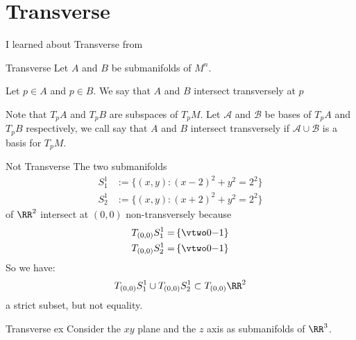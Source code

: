 \section{Transverse}

I learned about Transverse from \cite{lee_2013}

\begin{boxDefinition}{Transverse}
Let \( A \) and \( B \) be submanifolds of \( M^n \).

Let \( p \in A \) and \( p \in B \).
We say that \( A \) and \( B \) intersect transversely at \( p \)

Note that \( T_pA \) and \( T_pB \) are subspaces of \( T_pM \).
Let \( \mathcal A \) and \( \mathcal B \) be bases of \( T_pA \) and \(T_pB \) respectively,
    we call say that \( A \) and \( B \) intersect transversely if \( \mathcal A \cup \mathcal B \) is a basis for \( T_pM \).
\end{boxDefinition}
\begin{boxExample}{Not Transverse}
The two submanifolds
\begin{align*} 
    S_1^1 &:= \{ (x,y) : (x-2)^2 + y^2 = 2^2 \}
    \\
    S_2^1 &:= \{ (x,y) : (x+2)^2 + y^2 = 2^2 \}
\end{align*}
of \( \RR^2 \) intersect at \( (0, 0) \) non-transversely because 
\begin{align*} 
    T_{(0,0)}S_1^1 = \span \left\{ \vtwo 0{-1} \right\}
    \\
    T_{(0,0)}S_2^1 = \span \left\{ \vtwo 0{-1} \right\}
\end{align*}
So we have:
\[
    T_{(0,0)}S_1^1 
    \cup 
    T_{(0,0)}S_2^1 
    \subset 
    T_{(0,0)}\RR^2 
\]
a strict subset, but not equality.
\end{boxExample}

\begin{boxExample}{Transverse ex}
Consider the \( xy \) plane and the \( z \) axis as submanifolds of \( \RR^3 \).
\end{boxExample}
